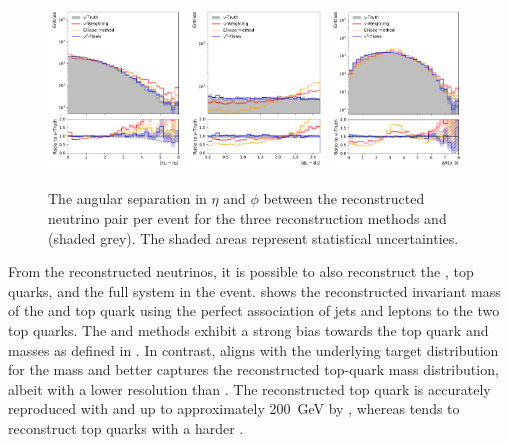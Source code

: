 \begin{figure}[htpb]
    \centering
    \includegraphics[width=0.32\textwidth]{Figures/neutrino_unfolding/nu_reco/nu_del_eta.pdf}
    \includegraphics[width=0.32\textwidth]{Figures/neutrino_unfolding/nu_reco/nu_del_phi.pdf}
    \includegraphics[width=0.32\textwidth]{Figures/neutrino_unfolding/nu_reco/nu_del_R.pdf}
    \caption{The angular separation in $\eta$ and $\phi$ between the reconstructed neutrino pair per event for the three reconstruction methods and \vtruth (shaded grey). The shaded areas represent statistical uncertainties.}
    \label{fig:vreco_delta}
\end{figure}

From the reconstructed neutrinos, it is possible to also reconstruct the \Wbosons, top quarks, and the full \ttbar system in the event.
 shows the reconstructed invariant mass of the \Wboson and top quark using the perfect association of jets and leptons to the two top quarks.
The \vweight and \ellipse methods exhibit a strong bias towards the top quark and \Wboson masses as defined in .
In contrast, \vvflows aligns with the underlying target distribution for the \Wboson mass and better captures the reconstructed top-quark mass distribution, albeit with a lower resolution than \vtruth.
The reconstructed top quark \pt is accurately reproduced with \vvflows and up to approximately 200~GeV by \vweight, whereas \ellipse tends to reconstruct top quarks with a harder \pt.

